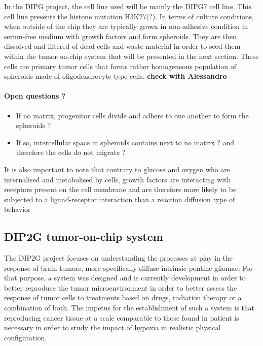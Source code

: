 \documentclass[11pt,a4paper]{article}
\begin{document}
In the DIPG project, the cell line used will be mainly the DIPG7 cell line. This cell line presents the histone mutation H3K27(?). In terms of culture conditions, when outside of the chip they are typically grown in non-adhesive condition in serum-free medium with growth factors and form spheroids. They are then dissolved and filtered of dead cells and waste material in order to seed them within the tumor-on-chip system that will be presented in the next section. These cells are primary tumor cells that forms rather homogeneous population of spheroids made of oligodendrocyte-type cells. \textbf{check with Alessandro} 

\paragraph{Open questions ?}
\begin{itemize}
\item If no matrix, progenitor cells divide and adhere to one another to form the spheroids ?
\item If so, intercellular space in spheroids contains next to no matrix ? and therefore the cells do not migrate ? 
\end{itemize}

It is also important to note that contrary to glucose and oxygen who are internalised and metabolised by cells, growth factors are interacting with receptors present on the cell membrane and are therefore more likely to be subjected to  a ligand-receptor interaction than a reaction diffusion type of behavior

\subsection{DIP2G tumor-on-chip system}
The DIP2G project focuses on understanding the processes at play in the response of brain tumors, more specifically diffuse intrinsic pontine gliomae. For that purpose, a system was designed and is currently development in order to better reproduce the tumor microenvironment in order to better assess the response of tumor cells to treatments based on drugs, radiation therapy or a combination of both. The impetus for the establishment of such a system is that reproducing cancer tissue at a scale comparable to those found in patient is necessary in order to study the impact of hypoxia in realistic physical configuration.
\end{document}
